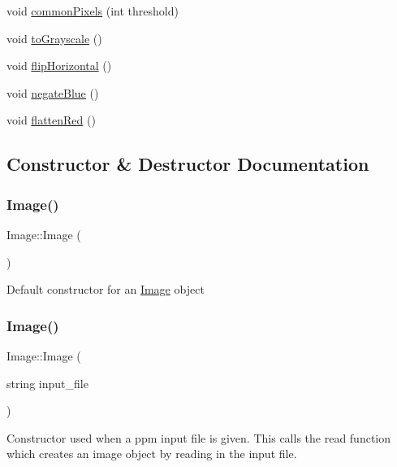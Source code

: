 \begin{DoxyCompactItemize}
\item 
void \hyperlink{class_image_a0a529f80b6de38ee9313aeea4c937983}{common\+Pixels} (int threshold)
\item 
void \hyperlink{class_image_ad6a65050729083c4e64c2a1cb4f5ee41}{to\+Grayscale} ()
\item 
void \hyperlink{class_image_a82d860b94ad3e5250fb077e063ce3fa6}{flip\+Horizontal} ()
\item 
void \hyperlink{class_image_a47f12bc0bd85a51e20cd12a514a9411a}{negate\+Blue} ()
\item 
void \hyperlink{class_image_a95fc031a2d406d17d6b4dadff743cf7c}{flatten\+Red} ()
\end{DoxyCompactItemize}


\subsection{Constructor \& Destructor Documentation}
\mbox{\label{class_image_a58edd1c45b4faeb5f789b0d036d02313}} 
\subsubsection{\texorpdfstring{Image()}{Image()}\hspace{0.1cm}{\footnotesize\ttfamily [1/3]}}
{\footnotesize\ttfamily Image\+::\+Image (\begin{DoxyParamCaption}{ }\end{DoxyParamCaption})}

Default constructor for an \hyperlink{class_image}{Image} object \mbox{\label{class_image_af2d2b2b46060ce7d4dda966d1bb29b45}} 
\subsubsection{\texorpdfstring{Image()}{Image()}\hspace{0.1cm}{\footnotesize\ttfamily [2/3]}}
{\footnotesize\ttfamily Image\+::\+Image (\begin{DoxyParamCaption}\item[{string}]{input\+\_\+file }\end{DoxyParamCaption})}

Constructor used when a ppm input file is given. This calls the read function which creates an image object by reading in the input file.


